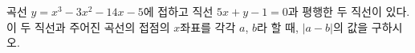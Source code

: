 곡선 $y=x^3-3x^2-14x-5$에 접하고 직선 $5x+y-1=0$과 평행한 두 직선이 있다. 이 두 직선과 주어진 곡선의 접점의 $x$좌표를 각각 $a$, $b$라 할 때, $|a-b|$의 값을 구하시오.

